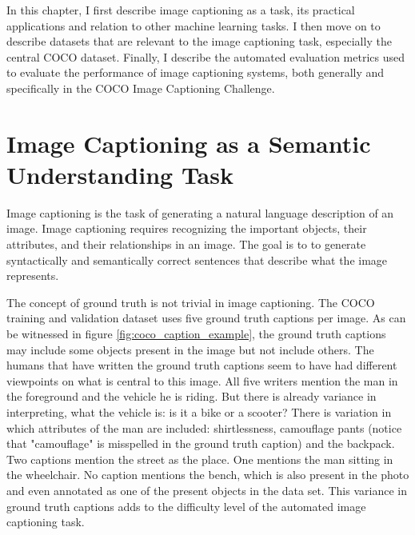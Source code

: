 \documentclass[english,twoside,openright]{HYgraduMLDS}
\begin{document}
In this chapter, I first describe image captioning as a task, its practical applications and relation to other machine learning tasks. I then move on to describe datasets that are relevant to the image captioning task, especially the central COCO dataset. Finally, I describe the automated evaluation metrics used to evaluate the performance of image captioning systems, both generally and specifically in the COCO Image Captioning Challenge.

\section{Image Captioning as a Semantic Understanding Task}
Image captioning is the task of generating a natural language description of an image. Image captioning requires recognizing the important objects, their attributes, and their relationships in an image. The goal is to to generate syntactically and semantically correct sentences that describe what the image represents.

The concept of ground truth is not trivial in image captioning. The COCO training and validation dataset uses five ground truth captions per image. As can be witnessed in figure \ref{fig:coco_caption_example}, the ground truth captions may include some objects present in the image but not include others. The humans that have written the ground truth captions seem to have had different viewpoints on what is central to this image. All five writers mention the man in the foreground and the vehicle he is riding. But there is already variance in interpreting, what the vehicle is: is it a bike or a scooter? There is variation in which attributes of the man are included: shirtlessness, camouflage pants (notice that "camouflage" is misspelled in the ground truth caption) and the backpack. Two captions mention the street as the place. One mentions the man sitting in the wheelchair. No caption mentions the bench, which is also present in the photo and even annotated as one of the present objects in the data set. This variance in ground truth captions adds to the difficulty level of the automated image captioning task.
\end{document}
